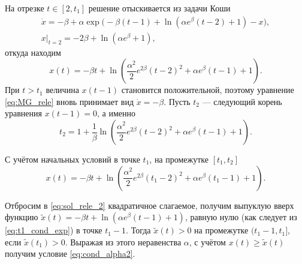 %
%
%

На отрезке $t \in [2, t_1]$ решение отыскивается из задачи Коши 
%
\begin{multline}
    \dot{x} = -\beta + \alpha\exp\bigg(-\beta(t - 1) + \ln(\alpha e^{\beta}(t - 2) + 1) - x\bigg),\\
    x|_{t = 2} = - 2 \beta + \ln(\alpha e^{\beta} + 1),
\end{multline}
%
откуда находим
\begin{equation}
	\label{eq:sol_rele_2}
    x(t) = -\beta t + \ln\left(\frac{\alpha^2}{2}e^{2\beta}(t - 2)^2+\alpha e^{\beta}(t - 1) + 1\right).
\end{equation}
%
При $t > t_1$ величина $x(t - 1)$ становится положительной, поэтому уравнение \eqref{eq:MG_rele} вновь принимает вид $\dot{x} = -\beta$. Пусть $t_2$ --- следующий корень уравнения $x(t - 1) = 0$, а именно
\begin{equation}
\label{eq:t2}
t_2 = 1 + \dfrac{1}{\beta}\ln\left(\frac{\alpha^2}{2}e^{2\beta}(t - 2)^2 + \alpha e^{\beta}(t - 1) + 1\right).
\end{equation}

С учётом начальных условий в точке $t_1$, на промежутке $[t_1, t_2]$
\begin{equation}
\label{eq:sol_rele_3}
    x(t) = -\beta t + \ln\left(\frac{\alpha^2}{2}e^{2\beta}(t_1 - 2)^2 + \alpha e^{\beta}(t_1 - 1) + 1\right).
\end{equation}

Отбросим в \eqref{eq:sol_rele_2} квадратичное слагаемое, получим выпуклую вверх функцию $\tilde{x}(t) = -\beta t + \ln(\alpha e^{\beta} (t - 1) + 1)$, равную нулю (как следует из \eqref{eq:t1_cond_exp}) в точке $t_1 - 1$. Тогда $\tilde{x}(t) > 0$ на промежутке $(t_1 - 1, t_1]$, если $\tilde{x}(t_1) > 0$. Выражая из этого неравенства $\alpha$, с учётом $x(t) \geqslant \tilde{x}(t)$ получим условие \eqref{eq:cond_alpha2}.

